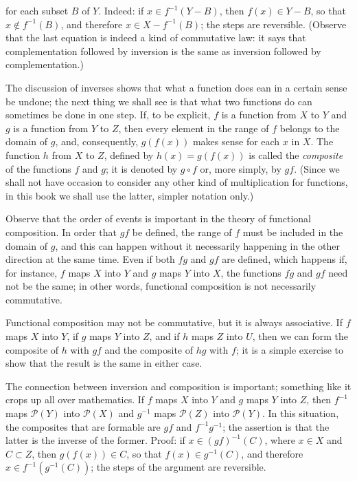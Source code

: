 for each subset $B$ of $Y$. Indeed: if $x \in f^{-1}(Y - B)$, then $f(x) \in Y - B$, so that $x \notin f^{-1}(B)$, and therefore $x \in X - f^{-1}(B)$; the steps are reversible. (Observe that the last equation is indeed a kind of commutative law: it says that complementation followed by inversion is the same as inversion followed by complementation.) 

The discussion of inverses shows that what a function does ean in a certain sense be undone; the next thing we shall see is that what two functions do can sometimes be done in one step. If, to be explicit, $f$ is a function from $X$ to $Y$ and $g$ is a function from $Y$ to $Z$, then every element in the range of $f$ belongs to the domain of $g$, and, consequently, $g(f(x))$ makes sense for each $x$ in $X$. The function $h$ from $X$ to $Z$, defined by $h(x) = g(f(x))$ is called the \textit{composite} of the functions $f$ and $g$; it is denoted by $g \circ f$ or, more simply, by $gf$. (Since we shall not have occasion to consider any other kind of multiplication for functions, in this book we shall use the latter, simpler notation only.) 

Observe that the order of events is important in the theory of functional composition. In order that $gf$ be defined, the range of $f$ must be included in the domain of $g$, and this can happen without it necessarily happening in the other direction at the same time. Even if both $fg$ and $gf$ are defined, which happens if, for instance, $f$ maps $X$ into $Y$ and $g$ maps $Y$ into $X$, the functions $fg$ and $gf$ need not be the same; in other words, functional composition is not necessarily commutative. 

Functional composition may not be commutative, but it is always associative. If $f$ maps $X$ into $Y$, if $g$ maps $Y$ into $Z$, and if $h$ maps $Z$ into $U$, then we can form the composite of $h$ with $gf$ and the composite of $hg$ with $f$; it is a simple exercise to show that the result is the same in either case. 

The connection between inversion and composition is important; something like it crops up all over mathematics. If $f$ maps $X$ into $Y$ and $g$ maps $Y$ into $Z$, then $f^{-1}$ maps $\mathcal{P}(Y)$ into $\mathcal{P}(X)$ and $g^{-1}$ maps $\mathcal{P}(Z)$ into $\mathcal{P}(Y)$. In this situation, the composites that are formable are $gf$ and $f^{-1}g^{-1}$; the assertion is that the latter is the inverse of the former. Proof: if $x \in (gf)^{-1}(C)$, where $x \in X$ and $C \subset Z$, then $g(f(x)) \in C$, so that $f(x) \in g^{-1}(C)$, and therefore $x \in f^{-1}(g^{-1}(C))$; the steps of the argument are reversible. 

